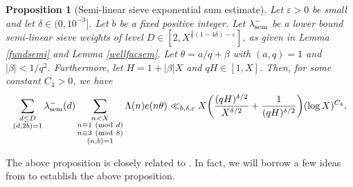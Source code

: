 \documentclass[12pt]{amsart}
\numberwithin{equation}{section}
\newtheorem{prop}[theorem]{Proposition}
\theoremstyle{remark}
\theoremstyle{definition}
\newcommand{\imod}[1]{\ (\mathrm{mod}\ #1)}
\begin{document}
\begin{prop}[Semi-linear sieve exponential sum estimate]\label{expsemi}
Let $\varepsilon>0$ be small and let $\delta\in (0, 10^{-3}]$. Let $b$ be a fixed positive integer. Let $\lambda_{\textup{sem}}^-$ be a lower bound semi-linear sieve weights of level $D\in [2, X^{\frac{3}{7}(1-4\delta)-\varepsilon}]$, as given in Lemma \ref{fundsemi} and Lemma \ref{wellfacsem}. Let $\theta= a/q + \beta$ with $(a, q)=1$ and $\lvert \beta\rvert <1/q^2$. Furthermore, let $H=1+|\beta|X$ and $qH\in [1, X]$. Then, for some constant $C_4>0$, we have 
\begin{equation}\label{expsemieqM}
\sum_{\substack{d\leq D\\(d,2b)=1}}\lambda_{\textup{sem}}^-(d)\sum_{\substack{n<X\\n \equiv 1 \imod d\\ n\equiv 3\imod 8\\(n, b)=1}}\Lambda(n)e(n\theta)\ll_{b, \delta, \varepsilon}  X\bigg(\dfrac{(qH)^{\delta/2}}{X^{\delta/2}} + \dfrac{1}{(qH)^{\delta/2}}\bigg)(\log X)^{C_4}.
\end{equation}
\end{prop}
The above proposition is closely related to \cite[Theorem 1.5]{Ter}. In fact, we will borrow a few ideas from \cite{Ter} to establish the above proposition.
\end{document}
